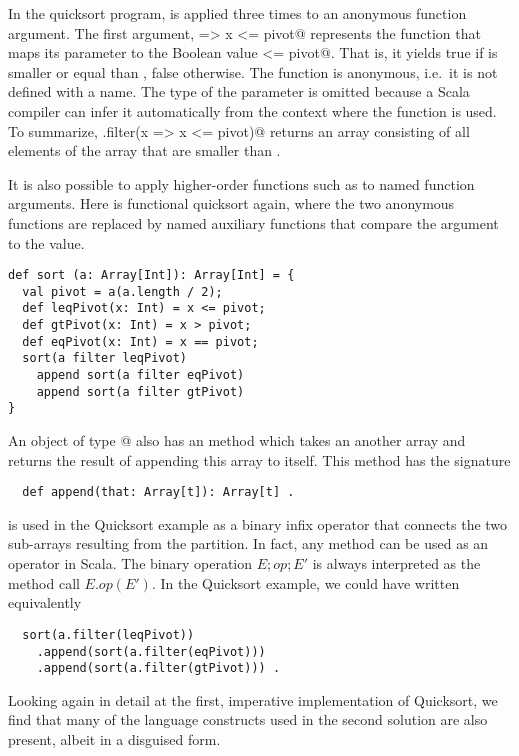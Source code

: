 \documentclass[11pt]{report}
\begin{document}
In the quicksort program, \verb@filter@ is applied three times to an
anonymous function argument.  The first argument,
\verb@x => x <= pivot@ represents the function that maps its parameter
\verb@x@ to the Boolean value \verb@x <= pivot@. That is, it yields
true if \verb@x@ is smaller or equal than \verb@pivot@, false
otherwise. The function is anonymous, i.e.\ it is not defined with a
name. The type of the \verb@x@ parameter is omitted because a Scala
compiler can infer it automatically from the context where the
function is used. To summarize, \verb@a.filter(x => x <= pivot)@
returns an array consisting of all elements of the array \verb@a@ that are
smaller than \verb@pivot@.

It is also possible to apply higher-order functions such as
\verb@filter@ to named function arguments. Here is functional
quicksort again, where the two anonymous functions are replaced by
named auxiliary functions that compare the argument to the
\verb@pivot@ value.

\begin{verbatim}
def sort (a: Array[Int]): Array[Int] = {
  val pivot = a(a.length / 2);
  def leqPivot(x: Int) = x <= pivot;
  def gtPivot(x: Int) = x > pivot;
  def eqPivot(x: Int) = x == pivot;
  sort(a filter leqPivot)
    append sort(a filter eqPivot)
    append sort(a filter gtPivot)
}
\end{verbatim}

An object of type \verb@Array[t]@ also has an \verb@append@ method
which takes an another array and returns the result of appending this
array to itself. This method has the signature
\begin{verbatim}
  def append(that: Array[t]): Array[t] .
\end{verbatim}
\verb@append@ is used in the Quicksort example as a binary infix
operator that connects the two sub-arrays resulting from the
partition. In fact, any method can be used as an operator in Scala.
The binary operation $E;op;E'$ is always interpreted as the method
call $E.op(E')$. In the Quicksort example, we could have written
equivalently
\begin{verbatim}
  sort(a.filter(leqPivot))
    .append(sort(a.filter(eqPivot)))
    .append(sort(a.filter(gtPivot))) .
\end{verbatim}

Looking again in detail at the first, imperative implementation of
Quicksort, we find that many of the language constructs used in the
second solution are also present, albeit in a disguised form.
\end{document}

